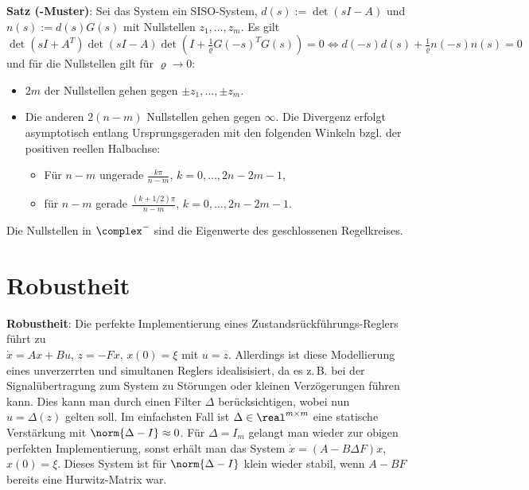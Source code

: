\linie

\textbf{Satz (-Muster)}:
Sei das System ein SISO-System, $d(s) := \det(sI - A)$ und
$n(s) := d(s) G(s)$ mit Nullstellen $z_1, \dotsc, z_m$.
Es gilt\\
$\det(sI + A^T) \det(sI - A)
\det(I + \frac{1}{\varrho} G(-s)^T G(s)) = 0
\iff
d(-s) d(s) + \frac{1}{\varrho} n(-s) n(s) = 0$\\
und für die Nullstellen gilt für $\varrho \to 0$:
\begin{itemize}
    \item
    $2m$ der Nullstellen gehen gegen $\pm z_1, \dotsc, \pm z_m$.

    \item
    Die anderen $2(n - m)$ Nullstellen gehen gegen $\infty$.
    Die Divergenz erfolgt asymptotisch entlang Ursprungsgeraden mit den folgenden Winkeln
    bzgl. der positiven reellen Halbachse:
    \begin{itemize}
        \item
        Für $n - m$ ungerade
        $\frac{k\pi}{n - m}$, $k = 0, \dotsc, 2n - 2m - 1$,

        \item
        für $n - m$ gerade
        $\frac{(k + 1/2)\pi}{n - m}$, $k = 0, \dotsc, 2n - 2m - 1$.
    \end{itemize}
\end{itemize}
Die Nullstellen in $\complex^-$ sind die Eigenwerte des geschlossenen Regelkreises.

\pagebreak

\section{%
    Robustheit%
}

\textbf{Robustheit}:
Die perfekte Implementierung eines Zustandsrückführungs-Reglers führt zu\\
$\dot{x} = Ax + Bu$, $z = -Fx$, $x(0) = \xi$ mit $u = z$.
Allerdings ist diese Modellierung eines unverzerrten und simultanen Reglers
idealisisiert, da es z.\,B. bei der Signalübertragung zum
System zu Störungen oder kleinen Verzögerungen führen kann.
Dies kann man durch einen Filter $\Delta$ berücksichtigen, wobei nun $u = \Delta(z)$ gelten soll.
Im einfachsten Fall ist $\Delta \in \real^{m \times m}$ eine statische Verstärkung
mit $\norm{\Delta - I} \approx 0$.
Für $\Delta = I_m$ gelangt man wieder zur obigen perfekten Implementierung, sonst erhält man
das System $\dot{x} = (A - B\Delta F)x$, $x(0) = \xi$.
Dieses System ist für $\norm{\Delta - I}$ klein wieder stabil, wenn $A - BF$ bereits eine
Hurwitz-Matrix war.

